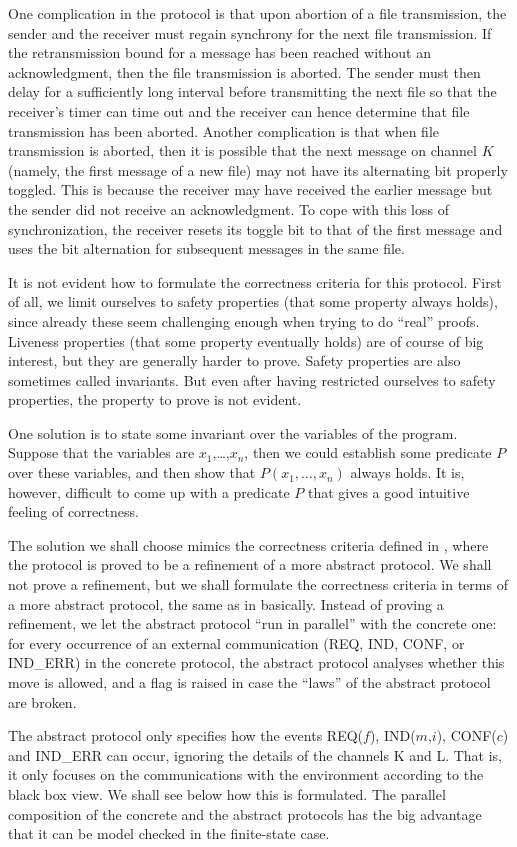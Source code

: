 One complication in the protocol is that  upon abortion of a file
transmission, the sender and the receiver must regain synchrony for the
next file transmission.  If the retransmission bound for a message has
been reached without an acknowledgment, then the file transmission is
aborted.  The sender must then delay for a sufficiently long interval
before transmitting the next file so that the
receiver's timer can time out and the receiver can hence determine 
that file transmission has been aborted.  Another complication is that
when file transmission is aborted, then it is possible that the next
message on channel $K$ (namely, the first message of a new file) may not
have its alternating bit properly toggled.  This is because the receiver
may have received the earlier message but the sender did not receive an
acknowledgment.  To cope with this loss of synchronization, the receiver
resets its toggle bit to that of the first message and uses the bit
alternation for subsequent messages in the same file.

It is not evident  how to formulate the  correctness criteria for this
protocol.  First of all, we limit ourselves to safety properties (that
some property always  holds),   since already these  seem  challenging
enough  when trying to do  ``real'' proofs.  Liveness properties (that
some property  eventually holds)  are of  course of big  interest, but
they are generally   harder  to prove.   Safety  properties  are  also
sometimes called invariants.   But   even  after  having    restricted
ourselves to safety properties, the property to prove is not evident.

One  solution  is to state  some invariant  over the  variables of the
program.  Suppose  that the variables are $x_1$,\ldots,$x_n$,  then
we could establish some  predicate $P$  over these variables, and
then show  that $P(x_1,\ldots,x_n)$ always  holds. It is, however,
difficult  to come up  with  a predicate  $P$  that  gives a good
intuitive feeling of correctness.

The solution we shall  choose mimics the correctness criteria  defined
in \cite{HSV:Protocol.Coq},   where  the protocol  is  proved  to be a
refinement of   a  more  abstract   protocol.  We  shall   not prove a
refinement, but we shall formulate  the correctness criteria in  terms
of a more  abstract protocol, the  same as  in \cite{HSV:Protocol.Coq}
basically.  Instead of proving a  refinement, we let  the
abstract protocol ``run in  parallel'' with the  concrete one: for every
occurrence of an external communication (REQ, IND,
CONF, or IND\_ERR) in the concrete protocol, the abstract 
protocol analyses whether this move  is allowed, and  a flag is raised
in case  the ``laws'' of the abstract  protocol are broken.

The   abstract protocol    only  specifies how   the events  REQ($f$),
IND($m$,$i$), CONF($c$) and IND\_ERR  can occur, ignoring  the details
of the   channels    K and L. That     is,  it only  focuses    on the
communications  with  the  environment   according  to the  black  box
view.  We  shall  see below  how   this is  formulated.  The  parallel
composition of  the concrete and  the  abstract protocols has the  big
advantage  that it can  be model checked in the  finite-state case.
